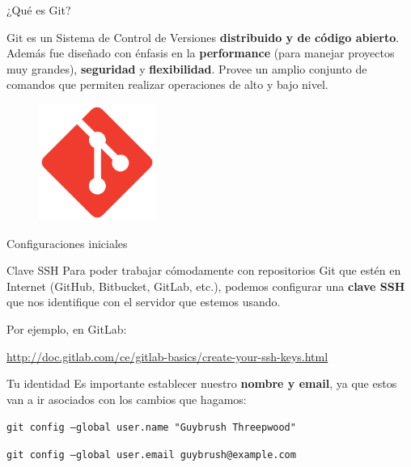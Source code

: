\begin{frame}{¿Qué es Git?}

	\begin{block}{}
		Git es un Sistema de Control de Versiones \textbf{distribuido y de código abierto}.
        Además fue diseñado con énfasis en la \textbf{performance} (para manejar proyectos muy grandes), \textbf{seguridad} y \textbf{flexibilidad}.
        Provee un amplio conjunto de comandos que permiten realizar operaciones de alto y bajo nivel.
	\end{block}

    \begin{figure}[ht]
        \begin{center}
            \includegraphics[height=1.5in]{images/logo-git.pdf}
        \end{center}
    \end{figure}
\end{frame}

\begin{frame}[fragile]{Configuraciones iniciales}

	\begin{block}{Clave SSH}
		Para poder trabajar cómodamente con repositorios Git que estén en Internet (GitHub, Bitbucket, GitLab, etc.), podemos configurar una \textbf{clave SSH} que nos identifique con el servidor que estemos usando.

        Por ejemplo, en GitLab:

        \url{http://doc.gitlab.com/ce/gitlab-basics/create-your-ssh-keys.html}
	\end{block}

    \begin{block}{Tu identidad}
        Es importante establecer nuestro \textbf{nombre y email}, ya que estos van a ir asociados con los cambios que hagamos:

        \vspace{0.5em}

        \texttt{git config --global user.name "Guybrush Threepwood"}

        \texttt{git config --global user.email guybrush@example.com}
    \end{block}


\end{frame}

